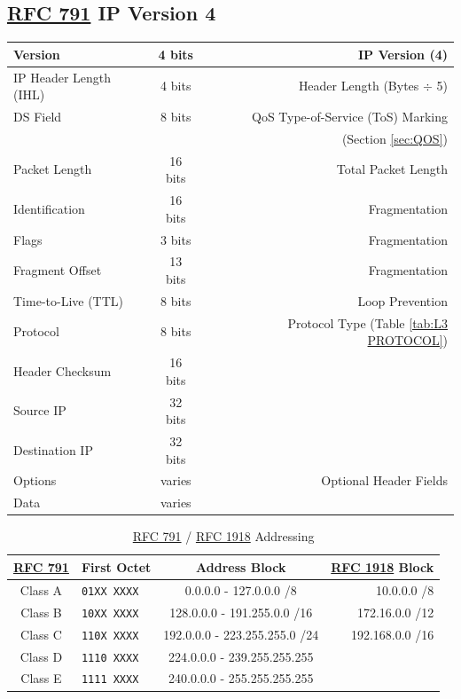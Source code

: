 \documentclass[12pt]{article}
\newcommand{\RFC}[1]{\href{https://datatracker.ietf.org/doc/html/rfc#1}{RFC #1}}
\begin{document}
	\subsection{\RFC{791} IP Version 4 \label{subsec:IPV4}}
	\begin{table}[H]
	\centering
	\begin{tabular}{| l | c | r |}
	\hline
	Version				& 4 bits	& IP Version (4)\\\hline
	IP Header Length (IHL)		& 4 bits	& Header Length (Bytes $\div$ 5)\\\hline
	DS Field				& 8 bits	& QoS Type-of-Service (ToS) Marking\\
						&		& (Section \ref{sec:QOS})\\\hline
	Packet Length			& 16 bits	& Total Packet Length\\\hline
	Identification			& 16 bits	& Fragmentation\\\hline
	Flags					& 3 bits	& Fragmentation\\\hline
	Fragment Offset			& 13 bits	& Fragmentation\\\hline
	Time-to-Live (TTL)		& 8 bits	& Loop Prevention\\\hline
	Protocol				& 8 bits	& Protocol Type (Table \ref{tab:L3 PROTOCOL})\\\hline
	Header Checksum		& 16 bits	&\\\hline
	Source IP				& 32 bits	&\\\hline
	Destination IP			& 32 bits	&\\\hline
	Options				& varies	& Optional Header Fields\\\hline
	Data					& varies	&\\\hline
	\end{tabular}\end{table}

	\begin{table}[H]
	\centering
	\caption{\RFC{791} / \RFC{1918} Addressing \label{tab:ADDRESSING IPV4}}
	\begin{tabular}{clcr}
	\hline
	\textbf{\RFC{791}}	& \textbf{First Octet}		& \textbf{Address Block}		& \textbf{\RFC{1918} Block}\\\hline
	Class A 			& \texttt{01XX XXXX}		& 0.0.0.0 - 127.0.0.0 /8			& 10.0.0.0 /8\\
	Class B 			& \texttt{10XX XXXX}		& 128.0.0.0 - 191.255.0.0 /16		& 172.16.0.0 /12\\
	Class C 			& \texttt{110X XXXX}		& 192.0.0.0 - 223.255.255.0 /24 	& 192.168.0.0 /16\\\hline
	Class D 			& \texttt{1110 XXXX}		& 224.0.0.0 - 239.255.255.255		&\\\hline
	Class E 			& \texttt{1111 XXXX}		& 240.0.0.0 - 255.255.255.255		&\\\hline
	\end{tabular}\end{table}
\end{document}
